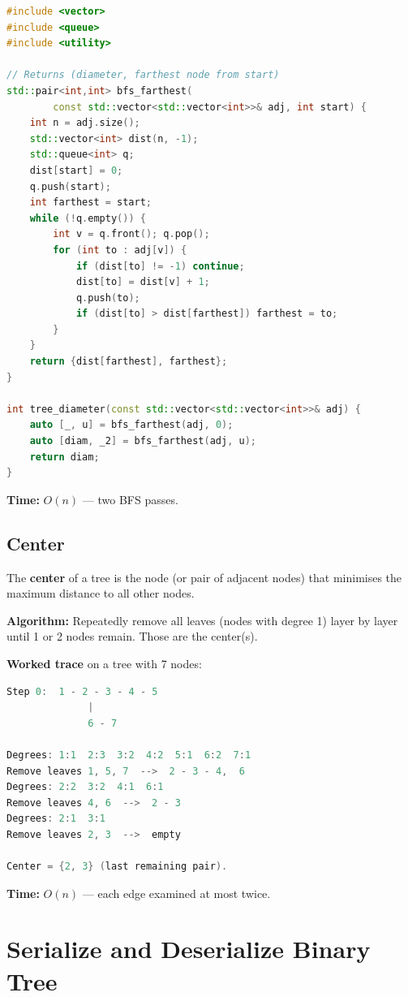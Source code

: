 \begin{lstlisting}[language=C++]
#include <vector>
#include <queue>
#include <utility>

// Returns (diameter, farthest node from start)
std::pair<int,int> bfs_farthest(
        const std::vector<std::vector<int>>& adj, int start) {
    int n = adj.size();
    std::vector<int> dist(n, -1);
    std::queue<int> q;
    dist[start] = 0;
    q.push(start);
    int farthest = start;
    while (!q.empty()) {
        int v = q.front(); q.pop();
        for (int to : adj[v]) {
            if (dist[to] != -1) continue;
            dist[to] = dist[v] + 1;
            q.push(to);
            if (dist[to] > dist[farthest]) farthest = to;
        }
    }
    return {dist[farthest], farthest};
}

int tree_diameter(const std::vector<std::vector<int>>& adj) {
    auto [_, u] = bfs_farthest(adj, 0);
    auto [diam, _2] = bfs_farthest(adj, u);
    return diam;
}
\end{lstlisting}

\textbf{Time:} $O(n)$ --- two BFS passes.

\subsection{Center}

The \textbf{center} of a tree is the node (or pair of adjacent nodes)
that minimises the maximum distance to all other nodes.

\textbf{Algorithm:} Repeatedly remove all leaves (nodes with degree 1)
layer by layer until 1 or 2 nodes remain.  Those are the center(s).

\textbf{Worked trace} on a tree with 7 nodes:

\begin{lstlisting}[language=Java]
Step 0:  1 - 2 - 3 - 4 - 5
              |
              6 - 7

Degrees: 1:1  2:3  3:2  4:2  5:1  6:2  7:1
Remove leaves 1, 5, 7  -->  2 - 3 - 4,  6
Degrees: 2:2  3:2  4:1  6:1
Remove leaves 4, 6  -->  2 - 3
Degrees: 2:1  3:1
Remove leaves 2, 3  -->  empty

Center = {2, 3} (last remaining pair).
\end{lstlisting}

\textbf{Time:} $O(n)$ --- each edge examined at most twice.

\section{Serialize and Deserialize Binary Tree}

